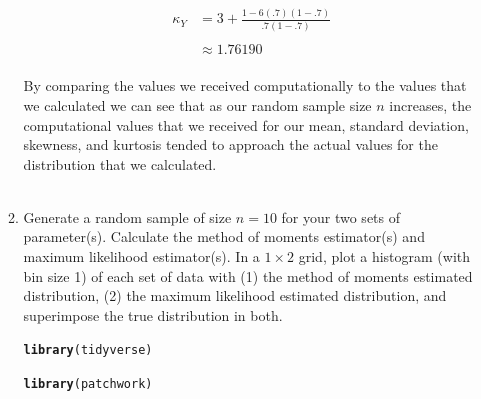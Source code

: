 \documentclass{article}\usepackage[]{graphicx}\usepackage[]{color}
\makeatletter
\newcommand{\hlstd}[1]{\textcolor[rgb]{0.345,0.345,0.345}{#1}}%
\newcommand{\hlkwd}[1]{\textcolor[rgb]{0.737,0.353,0.396}{\textbf{#1}}}%
\newenvironment{kframe}{%
 \def\at@end@of@kframe{}%
 \ifinner\ifhmode%
  \def\at@end@of@kframe{\end{minipage}}%
  \begin{minipage}{\columnwidth}%
 \fi\fi%
 \def\FrameCommand##1{\hskip\@totalleftmargin \hskip-\fboxsep
 \colorbox{shadecolor}{##1}\hskip-\fboxsep
     \hskip-\linewidth \hskip-\@totalleftmargin \hskip\columnwidth}%
 \MakeFramed {\advance\hsize-\width
   \@totalleftmargin\z@ \linewidth\hsize
   \@setminipage}}%
 {\par\unskip\endMakeFramed%
 \at@end@of@kframe}
\newenvironment{knitrout}{}{} %
\makeatother
\begin{document}
\begin{enumerate}
\begin{enumerate}
\begin{align*}\kappa_{Y} & =3+\frac{1-6\left(.7\right)\left(1-.7\right)}{.7\left(1-.7\right)}\\
\\
 & \approx1.76190
\end{align*}\\
By comparing the values we received computationally to the values that we calculated we can see that as our random sample size $n$ increases, the computational values that we received for our mean, standard deviation, skewness, and kurtosis tended to approach the actual values for the distribution that we calculated.\\
\\
  \item Generate a random sample of size $n=10$ for your two sets of parameter(s).
  Calculate the method of moments estimator(s) and maximum likelihood estimator(s).
  In a $1 \times 2$ grid, plot a histogram (with bin size 1) of each set of data 
  with (1) the method of moments estimated distribution, (2) the maximum likelihood 
  estimated distribution, and superimpose the true distribution in both.
\begin{knitrout}
\color{fgcolor}\begin{kframe}
\begin{alltt}
\hlkwd{library}\hlstd{(tidyverse)}
\end{alltt}


{\ttfamily\noindent\itshape\color{messagecolor}{\#\# -- Attaching packages --------------------------------------- tidyverse 1.3.1 --}}

{\ttfamily\noindent\itshape\color{messagecolor}{\#\# v ggplot2 3.3.5 \ \ \ \ v purrr \ \ 0.3.4\\\#\# v tibble \ 3.1.4 \ \ \ \ v dplyr \ \ 1.0.7\\\#\# v tidyr \ \ 1.1.3 \ \ \ \ v stringr 1.4.0\\\#\# v readr \ \ 2.0.1 \ \ \ \ v forcats 0.5.1}}

{\ttfamily\noindent\itshape\color{messagecolor}{\#\# -- Conflicts ------------------------------------------ tidyverse\_conflicts() --\\\#\# x dplyr::filter() masks stats::filter()\\\#\# x dplyr::lag() \ \ \ masks stats::lag()}}\begin{alltt}
\hlkwd{library}\hlstd{(patchwork)}


\end{alltt}
\end{kframe}
\end{knitrout}
\end{enumerate}
\end{enumerate}
\end{document}
